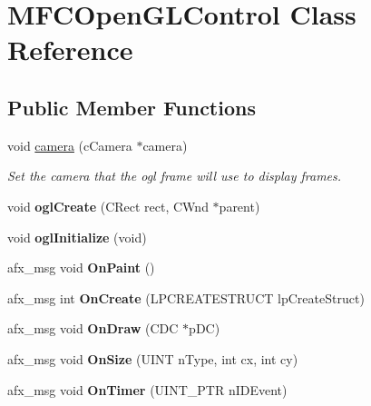 \hypertarget{classMFCOpenGLControl}{
\section{MFCOpenGLControl Class Reference}
\label{classMFCOpenGLControl}
}
\subsection*{Public Member Functions}
\begin{DoxyCompactItemize}
\item 
void \hyperlink{classMFCOpenGLControl_abec556c4f74065ddc0ff06de9936ce05}{camera} (cCamera $\ast$camera)
\begin{DoxyCompactList}\small\item\em Set the camera that the ogl frame will use to display frames. \item\end{DoxyCompactList}\item 
\hypertarget{classMFCOpenGLControl_a3342c46d98d5f24ef1a7c7eb29ffac9f}{
void {\bfseries oglCreate} (CRect rect, CWnd $\ast$parent)}
\label{classMFCOpenGLControl_a3342c46d98d5f24ef1a7c7eb29ffac9f}

\item 
\hypertarget{classMFCOpenGLControl_a6b8a3076ae04e9872606834e90ed1e49}{
void {\bfseries oglInitialize} (void)}
\label{classMFCOpenGLControl_a6b8a3076ae04e9872606834e90ed1e49}

\item 
\hypertarget{classMFCOpenGLControl_a297305ddb3f2572a991094ef4e1fff68}{
afx\_\-msg void {\bfseries OnPaint} ()}
\label{classMFCOpenGLControl_a297305ddb3f2572a991094ef4e1fff68}

\item 
\hypertarget{classMFCOpenGLControl_a989f49efb8a557c4d1b3b2f180dbdbdc}{
afx\_\-msg int {\bfseries OnCreate} (LPCREATESTRUCT lpCreateStruct)}
\label{classMFCOpenGLControl_a989f49efb8a557c4d1b3b2f180dbdbdc}

\item 
\hypertarget{classMFCOpenGLControl_a8956e55122f375bb9bbe4f1ad55f3470}{
afx\_\-msg void {\bfseries OnDraw} (CDC $\ast$pDC)}
\label{classMFCOpenGLControl_a8956e55122f375bb9bbe4f1ad55f3470}

\item 
\hypertarget{classMFCOpenGLControl_a6b585bc2fa6380208b8e9af5d91ceddf}{
afx\_\-msg void {\bfseries OnSize} (UINT nType, int cx, int cy)}
\label{classMFCOpenGLControl_a6b585bc2fa6380208b8e9af5d91ceddf}

\item 
\hypertarget{classMFCOpenGLControl_ace04284c25e46ca408a05cf4f2a9ccd4}{
afx\_\-msg void {\bfseries OnTimer} (UINT\_\-PTR nIDEvent)}
\label{classMFCOpenGLControl_ace04284c25e46ca408a05cf4f2a9ccd4}

\end{DoxyCompactItemize}


